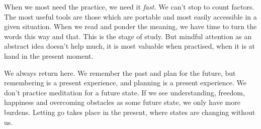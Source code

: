 When we most need the practice, we need it \emph{fast.} We can't stop to
count factors. The most useful tools are those which are portable and
most easily accessible in a given situation. When we read and ponder the
meaning, we have time to turn the words this way and that. This is the
stage of study. But mindful attention as an abstract idea doesn't help
much, it is most valuable when practised, when it is at hand in the
present moment.

We always return here. We remember the past and plan for the future, but
remembering is a present experience, and planning is a present
experience. We don't practice meditation for a future state. If we see
understanding, freedom, happiness and overcoming obstacles as some
future state, we only have more burdens. Letting go takes place in the
present, where states are changing without us.
